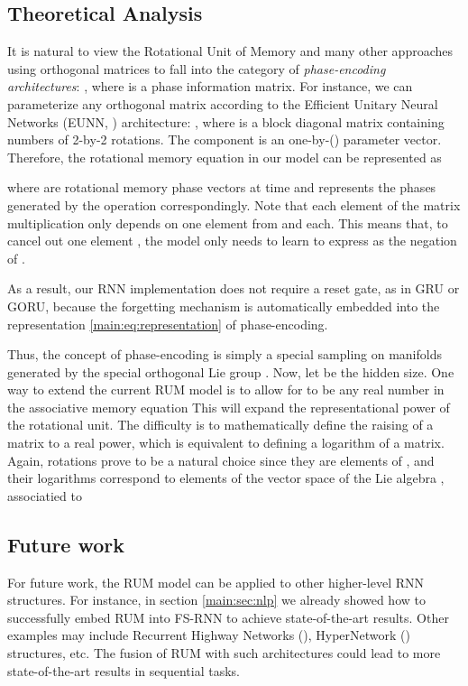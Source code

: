 \documentclass{article} \usepackage{iclr2018_conference,times}
\begin{document}
\subsection{Theoretical Analysis}
It is natural to view the Rotational Unit of Memory and many other approaches using orthogonal matrices to fall into the category of \textit{phase-encoding architectures}: , where  is a phase information matrix. For instance, we can parameterize any orthogonal matrix according to the Efficient Unitary Neural Networks (EUNN, \cite{jing2016tunable}) architecture:
, where  is a block diagonal matrix containing  numbers of 2-by-2 rotations. The component  is an one-by-() parameter vector. Therefore, the rotational memory equation in our model can be represented as

where  are rotational memory phase vectors at time  and  represents the phases generated by the operation  correspondingly. 
Note that each element of the matrix multiplication  only depends on one element from  and  each. This means that, to cancel out one element , the model only needs to learn to express  as the negation of . 

 As a result, our RNN implementation does not require a reset gate, as in GRU or GORU, because the forgetting mechanism is automatically embedded into the representation \eqref{main:eq:representation} of phase-encoding. 

Thus, the concept of phase-encoding is simply a special sampling on manifolds generated by the special orthogonal Lie group . Now, let  be the hidden size. One way to extend the current RUM model is to allow for  to be any real number in the associative memory equation  This will expand the representational power of the rotational unit. The difficulty is to mathematically define the raising of a matrix to a real power, which is equivalent to defining a logarithm of a matrix. Again, rotations prove to be a natural choice since they are elements of , and their logarithms correspond to elements of the vector space of the Lie algebra , associatied to 

\subsection{Future work}
For future work, the RUM model can be applied to other higher-level RNN structures. For instance, in section \ref{main:sec:nlp} we already showed how to successfully embed RUM into FS-RNN to achieve state-of-the-art results. Other examples may include Recurrent Highway Networks (\cite{zilly2016recurrent}), HyperNetwork (\cite{ha2016ptb}) structures, etc. The fusion of RUM with such architectures could lead to more state-of-the-art results in sequential tasks. 
\end{document}
